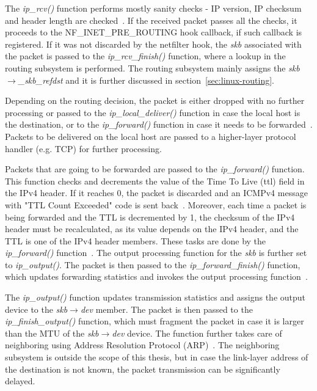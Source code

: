 The {\it{ip\_rcv()}} function performs mostly sanity checks -
IP version, IP checksum and header length are checked~\cite{kernel-source}.
If the received packet passes all the checks, it proceeds to the NF\_INET\_PRE\_ROUTING hook callback,
if such callback is registered.
If it was not discarded by the netfilter hook,
the {\it{skb}} associated with the packet is passed to the {\it{ip\_rcv\_finish()}} function,
where a lookup in the routing subsystem is performed.
The routing subsystem mainly assigns the {\it{skb$\rightarrow$\_skb\_refdst}} and it is further discussed in section~\ref{sec:linux-routing}.

Depending on the routing decision, the packet is either dropped with no further processing
or passed to the {\it{ip\_local\_deliver()}} function in case
the local host is the destination, or to the {\it{ip\_forward()}} function in case it needs to be forwarded~\cite{linux-kernel-networking}.
Packets to be delivered on the local host are passed to a higher-layer protocol handler (e.g. TCP)
for further processing.

Packets that are going to be forwarded are passed to the {\it{ip\_forward()}} function.
This function checks and decrements the value of the Time To Live (ttl) field in the IPv4 header.
If it reaches 0, the packet is discarded and an ICMPv4 message with "TTL Count Exceeded" code is sent back~\cite{linux-kernel-networking}.
Moreover, each time a packet is being
forwarded and the TTL is decremented by 1,
the checksum of the IPv4 header must be recalculated,
as its value depends on the IPv4 header, and the TTL is one of the IPv4 header members.
These tasks are done by the {\it{ip\_forward()}} function~\cite{linux-kernel-networking}.
The output processing function for the {\it{skb}} is further set to {\it{ip\_output()}}.
The packet is then passed to the {\it{ip\_forward\_finish()}} function,
which updates forwarding statistics and invokes the output processing function~\cite{linux-kernel-networking}.

The {\it{ip\_output()}} function updates transmission statistics and
assigns the output device to the {\it{skb$\rightarrow$dev}} member.
The packet is then passed to the {\it{ip\_finish\_output()}} function,
which must fragment the packet in case it is larger than the MTU of the {\it{skb$\rightarrow$dev}} device.
The function further takes care of neighboring using Address Resolution Protocol (ARP)~\cite{kernel-source}.
The neighboring subsystem is outside the scope of this thesis,
but in case the link-layer address of the destination is not known,
the packet transmission can be significantly delayed.
